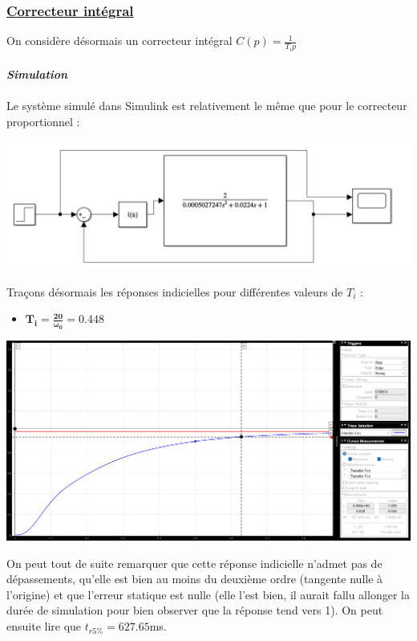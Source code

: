 \documentclass[12pt]{article}
\begin{document}
\subsubsection{\underline{\bf Correcteur intégral}}

On considère désormais un correcteur intégral $C(p) = \frac{1}{T_ip}$
\\\\\large \textit{ \textbf{Simulation}} 
\\\\\normalsize Le système simulé dans Simulink est relativement le même que pour le correcteur proportionnel : 
\begin{center}
    \includegraphics[width = 15 cm]{TP2 Simulink/Syst_2/Syst_2_Simulink_I.png}
\end{center}

Traçons désormais les réponses indicielles pour différentes valeurs de $T_i$ : 
\begin{itemize}
    \item \large $\mathbf{T_i = \frac{20}{\omega_0} = 0.448}$
\end{itemize}

\begin{center}
    \includegraphics[width = 19 cm]{TP2 Simulink/Syst_2/tr5prct_4.2_Ti=20_sur_omega0.png}

\end{center}
On peut tout de suite remarquer que cette réponse indicielle n'admet pas de dépassements, qu'elle est bien au moins du deuxième ordre (tangente nulle à l'origine) et que l'erreur statique est nulle (elle l'est bien, il aurait fallu allonger la durée de simulation pour bien observer que la réponse tend vers 1).
On peut ensuite lire que $t_{r5\%} = 627.65$ms.
\end{document}
